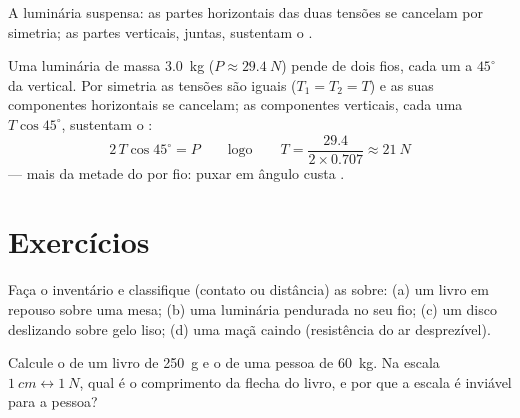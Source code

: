 \begin{omfigure}

{\small A luminária suspensa: as partes horizontais das duas tensões se
cancelam por simetria; as partes verticais, juntas, sustentam o .}
\end{omfigure}

\begin{example}\label{ex:g10:inertia:lamp}
Uma luminária de massa \qty{3.0}{kg} ($P \approx \qty{29.4}{N}$) pende de
dois fios, cada um a $45^\circ$ da vertical. Por simetria as tensões são
iguais ($T_1 = T_2 = T$) e as suas componentes horizontais se cancelam;
as componentes verticais, cada uma $T \cos 45^\circ$, sustentam o :
\[
2\,T \cos 45^\circ = P
\qquad\text{logo}\qquad
T = \frac{29.4}{2 \times 0.707} \approx \qty{21}{N}
\]
--- mais da metade do  por fio: puxar em ângulo custa .
\end{example}

\section{Exercícios}

\begin{exercise}[$\star$]\label{exo:g10:inertia:1}
Faça o inventário e classifique (contato ou distância) as  sobre:
(a) um livro em repouso sobre uma mesa; (b) uma luminária pendurada no
seu fio; (c) um disco deslizando sobre gelo liso; (d) uma maçã caindo
(resistência do ar desprezível).
\end{exercise}

\begin{exercise}[$\star$]\label{exo:g10:inertia:2}
Calcule o  de um livro de \qty{250}{g} e o de uma pessoa de
\qty{60}{kg}. Na escala $\qty{1}{cm} \leftrightarrow \qty{1}{N}$, qual é
o comprimento da flecha do livro, e por que a escala é inviável para a
pessoa?
\end{exercise}

